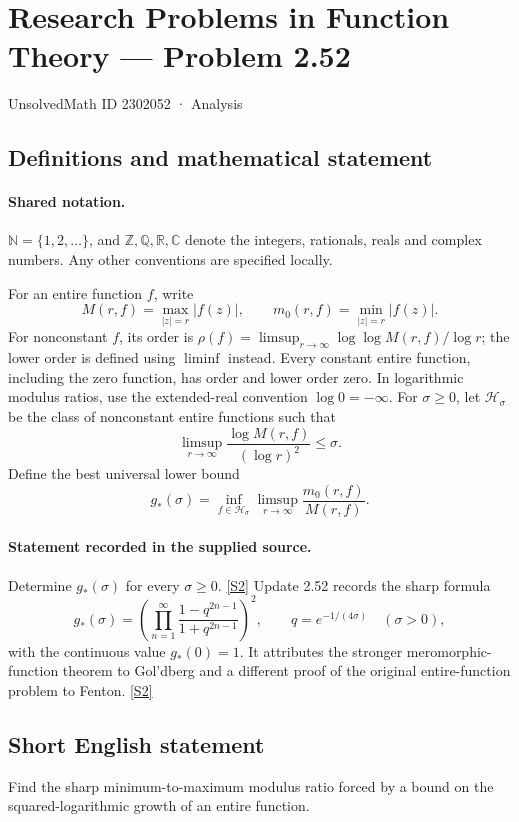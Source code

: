 \documentclass[11pt]{article}
\newcommand{\sref}[2]{\hyperlink{source:#1:#2}{[S#2]}}
\begin{document}
\setcounter{section}{2302051}
\section{Research Problems in Function Theory — Problem 2.52}\label{2302052}
{\small\sffamily UnsolvedMath ID 2302052 · Analysis}
\subsection{Definitions and mathematical statement}

\paragraph{Shared notation.}$\mathbb N=\{1,2,\ldots\}$, and $\mathbb Z,\mathbb Q,\mathbb R,\mathbb C$ denote the integers, rationals, reals and complex numbers. Any other conventions are specified locally.


For an entire function $f$, write
\[
 M(r,f)=\max_{|z|=r}|f(z)|,\qquad m_0(r,f)=\min_{|z|=r}|f(z)|.
\]
For nonconstant $f$, its order is $\rho(f)=\limsup_{r\to\infty}\log\log M(r,f)/\log r$;
the lower order is defined using $\liminf$ instead. Every constant entire function, including the zero function, has order and lower order zero. In logarithmic modulus ratios, use the extended-real convention $\log0=-\infty$.
For $\sigma\ge0$, let $\mathcal H_\sigma$ be the class of nonconstant entire functions such that
\[\limsup_{r\to\infty}\frac{\log M(r,f)}{(\log r)^2}\le\sigma.\]
Define the best universal lower bound
\[g_*(\sigma)=\inf_{f\in\mathcal H_\sigma}\limsup_{r\to\infty}\frac{m_0(r,f)}{M(r,f)}.\]

\paragraph{Statement recorded in the supplied source.}
Determine $g_*(\sigma)$ for every $\sigma\ge0$. \sref{2302052}{2}
Update 2.52 records the sharp formula
\[
g_*(\sigma)=\left(\prod_{n=1}^{\infty}\frac{1-q^{2n-1}}{1+q^{2n-1}}\right)^2,
\qquad q=e^{-1/(4\sigma)}\quad(\sigma>0),
\]
with the continuous value $g_*(0)=1$. It attributes the stronger meromorphic-function theorem to Gol'dberg and a different proof of the original entire-function problem to Fenton. \sref{2302052}{2}
\subsection{Short English statement}
Find the sharp minimum-to-maximum modulus ratio forced by a bound on the squared-logarithmic growth of an entire function.
\end{document}
